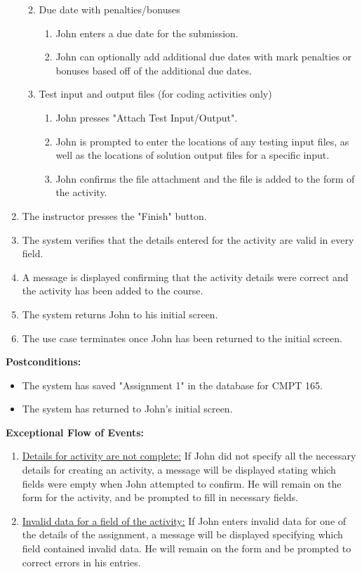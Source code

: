 \documentclass{article}
\begin{document}
\begin{enumerate}
\begin{enumerate}
\begin{enumerate}
		\end{enumerate}
		\item Due date with penalties/bonuses
			\begin{enumerate}
				\item John enters a due date for the submission.
				\item John can optionally add additional due dates with mark penalties or
					bonuses based off of the additional due dates.
			\end{enumerate}
		\item Test input and output files (for coding activities only)
			\begin{enumerate}
				\item John presses "Attach Test Input/Output".
				\item John is prompted to enter the locations of any testing input
					files, as well as the locations of solution output files for a specific
					input. 
				\item John confirms the file attachment and the file is added to the form of
					the activity.
			\end{enumerate}
	\end{enumerate}
	\item The instructor presses the "Finish" button.
	\item The system verifies that the details entered for the activity are valid in every field.
	\item A message is displayed confirming that the activity details were correct and the
		activity has been added to the course.
	\item The system returns John to his initial screen.
	\item The use case terminates once John has been returned to the initial
		screen.
\end{enumerate}
\textbf{Postconditions:}
\begin{itemize}
	\item The system has saved "Assignment 1" in the database for CMPT 165.
	\item The system has returned to John's initial screen.
\end{itemize}
\textbf{Exceptional Flow of Events:}
\begin{enumerate}
	\item \underline{Details for activity are not complete:} If John did not specify
			all the necessary details for creating an activity, a message will be displayed
			stating which fields were empty when John attempted to confirm.
			He will remain on the form for the activity, and be prompted to fill in necessary
			fields.
	\item \underline{Invalid data for a field of the activity:} If John enters invalid
			data for one of the details of the assignment, a message will be displayed
			specifying which field contained invalid data. He will remain on the form and
			be prompted to correct errors in his entries.
\end{enumerate}
\end{document}

